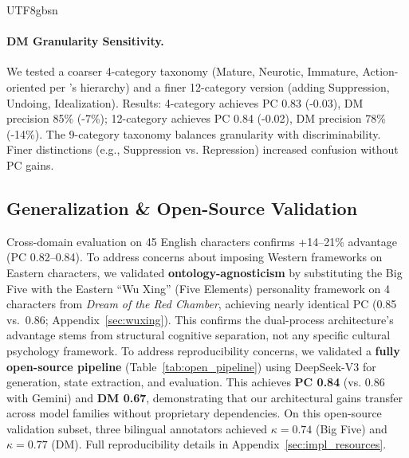 \documentclass[11pt]{article}
\begin{document}
\begin{CJK*}{UTF8}{gbsn}
\paragraph{DM Granularity Sensitivity.} We tested a coarser 4-category taxonomy (Mature, Neurotic, Immature, Action-oriented per \citet{vaillant1994ego}'s hierarchy) and a finer 12-category version (adding Suppression, Undoing, Idealization). Results: 4-category achieves PC 0.83 (-0.03), DM precision 85\% (-7\%); 12-category achieves PC 0.84 (-0.02), DM precision 78\% (-14\%). The 9-category taxonomy balances granularity with discriminability. Finer distinctions (e.g., Suppression vs. Repression) increased confusion without PC gains.

\subsection{Generalization \& Open-Source Validation}
\label{sec:generalization}
\label{sec:opensource_pipeline}

\begin{table}[h]
\centering
\scriptsize
{}
\caption{Open-source pipeline validation. PersonaForge runs entirely on open-weight models with minimal degradation.}
\label{tab:open_pipeline}
\end{table}

Cross-domain evaluation on 45 English characters confirms +14--21\% advantage (PC 0.82--0.84). To address concerns about imposing Western frameworks on Eastern characters, we validated \textbf{ontology-agnosticism} by substituting the Big Five with the Eastern ``Wu Xing'' (Five Elements) personality framework on 4 characters from \textit{Dream of the Red Chamber}, achieving nearly identical PC (0.85 vs.\ 0.86; Appendix~\ref{sec:wuxing}). This confirms the dual-process architecture's advantage stems from structural cognitive separation, not any specific cultural psychology framework. To address reproducibility concerns, we validated a \textbf{fully open-source pipeline} (Table~\ref{tab:open_pipeline}) using DeepSeek-V3 for generation, state extraction, and evaluation. This achieves \textbf{PC 0.84} (vs. 0.86 with Gemini) and \textbf{DM 0.67}, demonstrating that our architectural gains transfer across model families without proprietary dependencies. On this open-source validation subset, three bilingual annotators achieved $\kappa = 0.74$ (Big Five) and $\kappa = 0.77$ (DM). Full reproducibility details in Appendix~\ref{sec:impl_resources}.


\end{CJK*}
\end{document}
